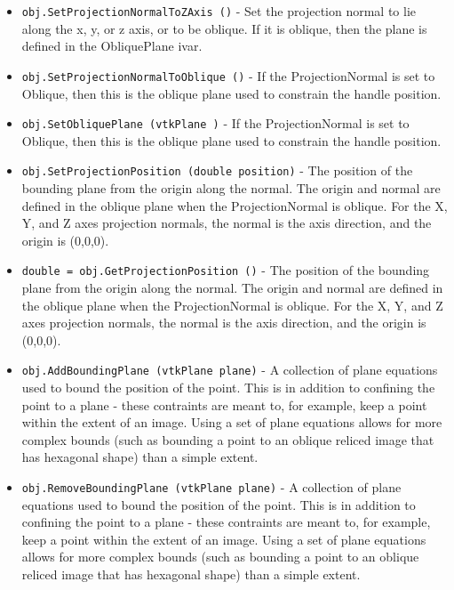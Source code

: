 \begin{itemize}
\item  \verb|obj.SetProjectionNormalToZAxis ()| -  Set the projection normal to lie along the x, y, or z axis,
 or to be oblique. If it is oblique, then the plane is 
 defined in the ObliquePlane ivar.

\item  \verb|obj.SetProjectionNormalToOblique ()| -  If the ProjectionNormal is set to Oblique, then this is the 
 oblique plane used to constrain the handle position.

\item  \verb|obj.SetObliquePlane (vtkPlane )| -  If the ProjectionNormal is set to Oblique, then this is the 
 oblique plane used to constrain the handle position.

\item  \verb|obj.SetProjectionPosition (double position)| -  The position of the bounding plane from the origin along the
 normal. The origin and normal are defined in the oblique plane
 when the ProjectionNormal is oblique. For the X, Y, and Z
 axes projection normals, the normal is the axis direction, and
 the origin is (0,0,0).

\item  \verb|double = obj.GetProjectionPosition ()| -  The position of the bounding plane from the origin along the
 normal. The origin and normal are defined in the oblique plane
 when the ProjectionNormal is oblique. For the X, Y, and Z
 axes projection normals, the normal is the axis direction, and
 the origin is (0,0,0).

\item  \verb|obj.AddBoundingPlane (vtkPlane plane)| -  A collection of plane equations used to bound the position of the point.
 This is in addition to confining the point to a plane - these contraints
 are meant to, for example, keep a point within the extent of an image.
 Using a set of plane equations allows for more complex bounds (such as
 bounding a point to an oblique reliced image that has hexagonal shape)
 than a simple extent.

\item  \verb|obj.RemoveBoundingPlane (vtkPlane plane)| -  A collection of plane equations used to bound the position of the point.
 This is in addition to confining the point to a plane - these contraints
 are meant to, for example, keep a point within the extent of an image.
 Using a set of plane equations allows for more complex bounds (such as
 bounding a point to an oblique reliced image that has hexagonal shape)
 than a simple extent.


\end{itemize}
